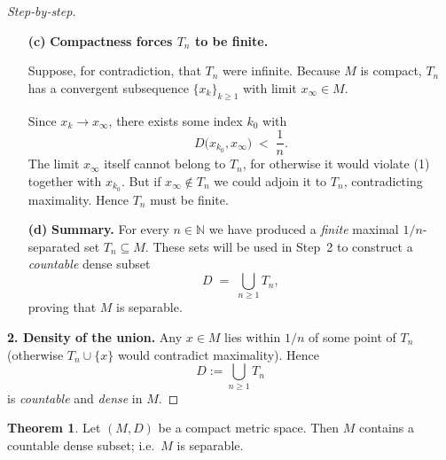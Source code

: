 \documentclass[12pt]{article}
\theoremstyle{definition} %
\newtheorem{theorem}{Theorem}
\theoremstyle{plain} %
\begin{document}
\begin{proof}[Step‑by‑step]
\begin{enumerate}
      \emph{Greedy alternative:}
      Start with any point, then keep adding new points that are
      at least \(1/n\) away from all previously chosen ones.
      Stop when no further point can be added; the result is maximal
      by construction.

\item[\textbf{(c)}] \textbf{Compactness forces \(T_n\) to be finite.}

      Suppose, for contradiction, that \(T_n\) were infinite.
      Because \(M\) is compact,
      \(T_n\) has a convergent subsequence \(\{x_{k}\}_{k\ge1}\)
      with limit \(x_\infty\in M\).

      \medskip\noindent
      Since \(x_{k}\to x_\infty\), there exists some index \(k_0\)
      with
      \[
          D\bigl(x_{k_0},x_\infty\bigr)\;<\;\frac1n.
      \]
      The limit \(x_\infty\) itself cannot belong to \(T_n\),
      for otherwise it would violate (1) together with \(x_{k_0}\).
      But if \(x_\infty\notin T_n\) we could adjoin it to \(T_n\),
      contradicting maximality.
      Hence \(T_n\) must be finite.

\item[\textbf{(d)}] \textbf{Summary.}
      For every \(n\in\mathbb N\) we have produced a \emph{finite}
      maximal \(1/n\)-separated set \(T_n\subseteq M\).
      These sets will be used in Step 2 to construct a \emph{countable}
      dense subset
      \[
           D\;=\;\bigcup_{n\ge1}T_n,
      \]
      proving that \(M\) is separable.
\end{enumerate}

  \textbf{2.  Density of the union.}  
  Any $x\in M$ lies within $1/n$ of some point of $T_n$
  (otherwise $T_n\cup\{x\}$ would contradict maximality).  
  Hence
  \[
      D:=\bigcup_{n\ge1}T_n
  \]
  is \emph{countable} and \emph{dense} in $M$.
\end{proof}


\begin{theorem}
  Let \((M,D)\) be a compact metric space.  
  Then \(M\) contains a countable dense subset; i.e.\ \(M\) is separable.
  \end{theorem}
  
\end{document}
